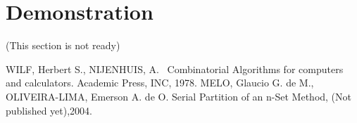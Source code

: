 \documentclass {amsart}
\begin{document}
\section*{Demonstration}
(This section is not ready)

\begin{thebibliography}{99}
 WILF, Herbert S., NIJENHUIS, A. ~Combinatorial Algorithms for computers and calculators. Academic
Press, INC, 1978.
 MELO, Glaucio G. de M., OLIVEIRA-LIMA, Emerson A. de O. Serial Partition of an n-Set Method,
(Not published yet),2004.
\end{thebibliography}
\end{document}
